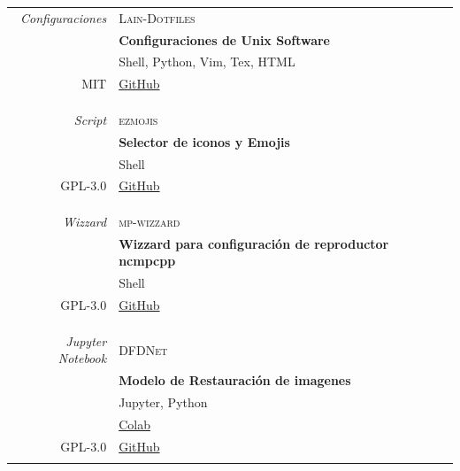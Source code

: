 \documentclass[a4paper,10pt]{article}
\begin{document}
\begin{tabular}{r|p{11cm}}
  \emph{Configuraciones}         & \textsc{Lain-Dotfiles}\\
	                               & \textbf{Configuraciones de Unix Software} \\
																 & Shell, Python, Vim, Tex, HTML\\
	\textsc{MIT}                   & \href{https://www.github.com/andyrufasto/Lain-Dotfiles}{GitHub}\\
				                         & \tvspace 
\\&\footnotesize{}\\\multicolumn{2}{c}{} \\
  \emph{Script}                  & \textsc{ezmojis}\\
	                               & \textbf{Selector de iconos y Emojis} \\
															   & Shell \\
	\textsc{GPL-3.0}               & \href{https://www.github.com/andyrufasto/ezmojis}{GitHub}\\
				                         & \tvspace \\&\footnotesize{}\\\multicolumn{2}{c}{} \\	
  \emph{Wizzard}                 & \textsc{mp-wizzard}\\
	                               & \textbf{Wizzard para configuración de reproductor ncmpcpp} \\
															   & Shell \\
	\textsc{GPL-3.0}               & \href{https://www.github.com/andyrufasto/mp-wizzard}{GitHub}\\
				                         & \tvspace \\&\footnotesize{}\\\multicolumn{2}{c}{} \\				                         
		  \emph{Jupyter Notebook}                     & \textsc{DFDNet}\\
	                               & \textbf{Modelo de Restauración de imagenes} \\
															   & Jupyter, Python\\
	                               & \href{https://colab.research.google.com/github/andyrufasto/DFDNet/blob/whole/DFDNet_Colab_Esp.ipynb}{Colab}\\
	\textsc{GPL-3.0}               & \href{https://github.com/andyrufasto/DFDNet}{GitHub}\\
				                         & \tvspace \\

\end{tabular}
\vfill
\end{document}
